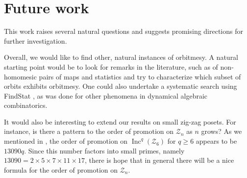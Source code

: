 \documentclass[11pt]{amsart}
\theoremstyle{definition}
\DeclareMathOperator{\Inc}{\mathrm{Inc}}
\newcommand{\calZ}{\mathcal{Z}}
\begin{document}
\section{Future work}\label{sec:future}

This work raises several natural questions and suggests promising directions for further investigation.

Overall, we would like to find other, natural instances of orbitmesy. A natural starting  point would be to look for remarks in the literature, such as \cite[Propositions 38 and 39]{Vorland} of non-homomesic pairs of maps and statistics and try to characterize which subset of orbits exhibits orbitmesy. One could also undertake a systematic search
 using FindStat \cite{FindStat}, as was done \cite{FindStat1,FindStat2} for other phenomena in dynamical algebraic combinatorics. 

It would also be interesting to extend our results on small zig-zag posets. For instance, is there a pattern to the order of promotion on $\calZ_n$ as $n$ grows? As we mentioned in , the order of promotion on $\Inc^q(\calZ_6)$ for $q \geq 6$ appears to be $13090q$. Since this number factors into small primes, namely  $13090 = 2 \times 5 \times 7 \times 11 \times 17$, there is hope that in general there will be a nice formula for the order of promotion on $\calZ_n$. 
\end{document}

